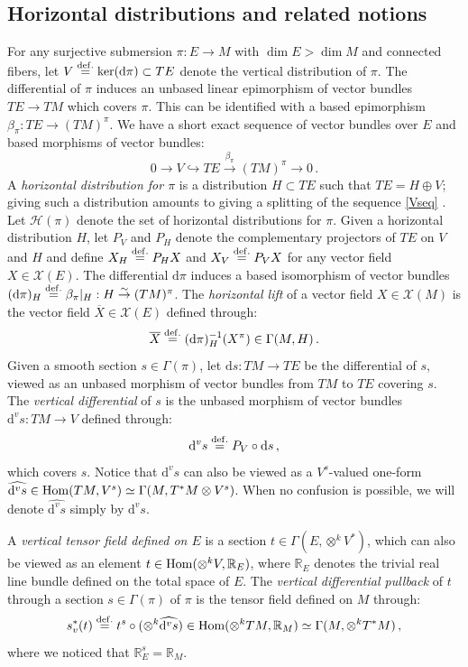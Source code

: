\documentclass[10pt, cmp, numbook, final, a4paper]{svjour}
\newcommand*{\SavedEqref}{}
\let\SavedEqref\eqref
\renewcommand*{\eqref}[1]{%
  \begingroup
    \hypersetup{
      linkcolor=blue,
      linkbordercolor=blue,
    }%
    \SavedEqref{#1}%
  \endgroup
}
\newcommand{\Hom}{{\rm Hom}}
\newcommand{\eqdef}{\stackrel{{\rm def.}}{=}}
\def\R{\mathbb{R}}
\def\dd{\mathrm{d}}
\newcommand{\be}{\begin{equation*}}
\newcommand{\ee}{\end{equation*}}
\newcommand{\ben}{\begin{equation}}
\newcommand{\een}{\end{equation}}
\def\cX{\mathcal{X}}
\def\cH{\mathcal{H}}
\def\cX{\mathcal{X}}
\begin{document}
\subsection{Horizontal distributions and related notions}

For any surjective submersion $\pi:E\rightarrow M$ with $\dim E>\dim
M$ and connected fibers, let $V \eqdef \ker (\dd \pi)\subset TE $
denote the vertical distribution of $\pi$. The differential of $\pi$
induces an unbased linear epimorphism of vector bundles $TE
\rightarrow TM$ which covers $\pi$. This can be identified with a
based epimorphism $\beta_\pi:TE \rightarrow (TM)^\pi$. We have a short
exact sequence of vector bundles over $E$ and based morphisms of
vector bundles:
\ben
\label{Vseq}
0\longrightarrow V \hookrightarrow T E\stackrel{\beta_\pi}{\longrightarrow} (TM)^\pi\longrightarrow 0\, .
\een
A {\em horizontal distribution for $\pi$} is a distribution $H\subset
TE$ such that $TE=H\oplus V$; giving such a distribution amounts to
giving a splitting of the sequence \eqref{Vseq}. Let $\cH(\pi)$ denote
the set of horizontal distributions for $\pi$. Given a horizontal
distribution $H$, let $P_V$ and $P_H$ denote the complementary
projectors of $TE$ on $V$ and $H$ and define $X_H\eqdef P_H X$ and
$X_V\eqdef P_V X$ for any vector field $X\in \cX(E)$. The differential
$\dd\pi$ induces a based isomorphism of vector bundles $(\dd
\pi)_H\eqdef \beta_\pi|_H:H \stackrel{\sim}{\rightarrow}
(TM)^\pi$. The {\em horizontal lift} of a vector field $X\in \cX(M)$
is the vector field $\overline{X}\in \cX(E)$ defined through:
\be
\overline{X}\eqdef (\dd\pi)_H^{-1}(X^\pi)\in \Gamma(M,H)\, .
\ee
Given a smooth section $s\in \Gamma(\pi)$, let $\dd s:TM\rightarrow
TE$ be the differential of $s$, viewed as an unbased morphism of
vector bundles from $TM$ to $TE$ covering $s$. The {\em vertical
  differential} of $s$ is the unbased morphism of vector bundles
$\dd^v s:TM\rightarrow V$ defined through:
\be 
\dd^v s\eqdef P_V\circ \dd s\, , 
\ee 
which covers $s$. Notice that $\dd^v s$ can also be viewed as a
$V^s$-valued one-form $\widehat{\dd^v s} \in\Hom(TM,V^s)\simeq
\Gamma(M,T^\ast M\otimes V^s)$. When no confusion is possible, we will
denote $\widehat{\dd^v s}$ simply by $\dd^{v} s$.

A {\em vertical tensor field defined on $E$} is a section $t\in
\Gamma(E,\otimes^k V^\ast)$, which can also be viewed as an element $t
\in \Hom(\otimes^k V,\R_E)$, where $\R_E$ denotes the trivial real
line bundle defined on the total space of $E$. The {\em vertical
  differential pullback} of $t$ through a section $s\in \Gamma(\pi)$
of $\pi$ is the tensor field defined on $M$ through:
\be
s^\ast_v(t)\eqdef t^s\circ (\otimes^k \widehat{\dd^v s})\in \Hom(\otimes^k TM, \R_M)\simeq \Gamma(M,\otimes^k T^\ast M)\, ,
\ee
where we noticed that $\R_E^s=\R_M$.
\end{document}
